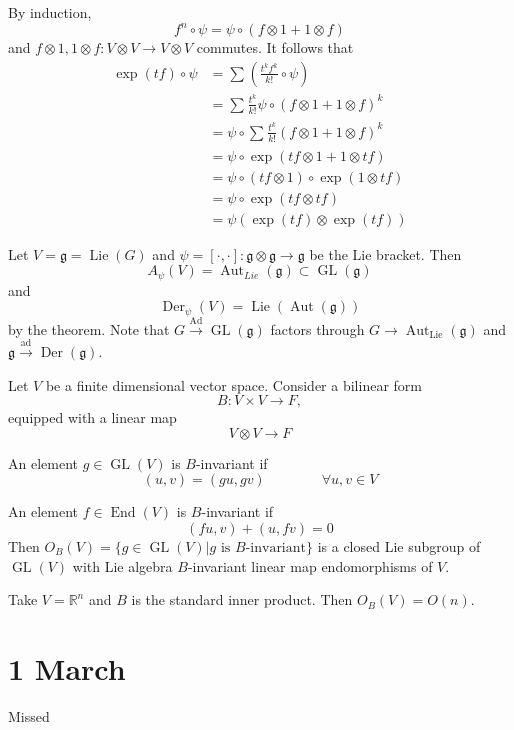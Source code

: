\documentclass[11pt,a4paper]{scrarticle}
\theoremstyle{definition}
\renewenvironment{proof}[1][\proofname]{\vspace{-10pt}\begin{myproof}}{\end{myproof}}
\theoremstyle{greenbox}
\newcommand{\R}{\mathbb{R}}
\newcommand{\fg}{\mathfrak{g}}
\begin{document}
\begin{proof}
    By induction, 
    \[ f^{n} \circ \psi = \psi \circ (f \otimes 1+ 1 \otimes f) \]
    and $ f \otimes 1 , 1 \otimes f : V \otimes V \to V \otimes V$ commutes. It follows that \begin{align*}
        \exp (tf) \circ \psi & = \sum_{}^{} \left( \frac{t^{k}f^{k}}{k!} \circ \psi \right) \\
        & = \sum_{}^{} \frac{t^{k}}{k!} \psi \circ (f \otimes 1 + 1 \otimes f)^{k} \\
        & = \psi \circ \sum_{}^{} \frac{t^{k}}{k!}(f \otimes 1 + 1 \otimes f)^{k} \\
        & = \psi \circ \exp (tf \otimes 1+ 1 \otimes tf) \\
        & = \psi \circ (tf \otimes 1) \circ \exp (1 \otimes tf) \\
        & = \psi \circ \exp (tf \otimes tf) \\
        & = \psi ( \exp (tf) \otimes \exp (tf))  
    \end{align*}
\end{proof}

Let $ V = \fg = \operatorname{Lie}(G) $ and $ \psi = [ \cdot, \cdot] : \fg \otimes \fg \to \fg$ be the Lie bracket. Then 
\[ A_{\psi}(V) = \operatorname{Aut}_{Lie}( \fg ) \subset \operatorname{GL}(\fg) \] and 
\[ \operatorname{Der}_{\psi}(V) = \operatorname{Lie}( \operatorname{Aut}(\fg)) \]
by the theorem. Note that $ G \xrightarrow{ \operatorname{Ad}} \operatorname{GL}(\fg)$ factors through $ G \to \operatorname{Aut}_{ \operatorname{Lie}}(\fg) $ and $ \fg \xrightarrow{ \operatorname{ad}} \operatorname{Der}(\fg) $.   


Let $ V $ be a finite dimensional vector space. Consider a bilinear form 
\[ B : V \times V \to F, \]
equipped with a linear map 
\[ V \otimes V \to F \]

An element $ g \in \operatorname{GL}(V) $ is $ B$-invariant if 
\[ (u,v) = (gu,gv) \qquad \qquad \forall u,v \in V\]

An element $ f \in \operatorname{End}(V) $ is $ B $-invariant if 
\[ (fu,v)+ (u,fv) = 0 \]
Then $ O_{B}(V) = \{g \in \operatorname{GL}(V)| g \text{ is }B \text{-invariant}\} $ is a closed Lie subgroup of $ \operatorname{GL}(V) $ with  Lie algebra $ B $-invariant linear map endomorphisms of $ V $.

\begin{example}
    Take $ V = \R^{n} $ and $ B $ is the standard inner product. Then $ O_{B}(V) = O(n) $.
\end{example}
\section{1 March}
Missed
\end{document}
